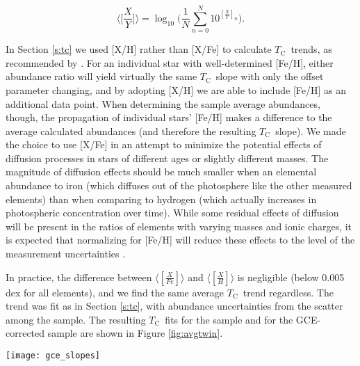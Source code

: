 \documentclass[twocolumn, trackchanges]{aastex62}
\newcommand{\tc}{$T_\mathrm{C}$}
\begin{document}
\begin{equation}
 \Big \langle \Big[ \frac{X}{Y} \Big] \Big \rangle = \log_{10} \Big( \frac{1}{N} \sum_{n=0}^{N} 10^{[\frac{X}{Y}]_n} \Big) .
\end{equation}

In Section \ref{s:tc} we used [X/H] rather than [X/Fe] to calculate \tc\ trends, as recommended by \citet{adibekyan16}. For an individual star with well-determined [Fe/H], either abundance ratio will yield virtually the same \tc\ slope with only the offset parameter changing, and by adopting [X/H] we are able to include [Fe/H] as an additional data point. When determining the sample average abundances, though, the propagation of individual stars' [Fe/H] makes a difference to the average calculated abundances (and therefore the resulting \tc\ slope). We made the choice to use [X/Fe] in an attempt to minimize the potential effects of diffusion processes in stars of different ages or slightly different masses. The magnitude of diffusion effects should be much smaller when  an elemental abundance to iron (which diffuses out of the photosphere like the other measured elements) than when comparing to hydrogen (which actually increases in photospheric concentration over time). While some residual effects of diffusion will be present in the ratios of elements with varying masses and ionic charges, it is expected that normalizing for [Fe/H] will reduce these effects to the level of the measurement uncertainties \citep{dotter17}.

In practice, the difference between $\langle [ \frac{X}{Fe} ] \rangle$ and $\langle [ \frac{X}{H} ] \rangle$ is negligible (below 0.005 dex for all elements), and we find the same average \tc\ trend regardless. The trend was fit as in Section \ref{s:tc}, with abundance uncertainties from the scatter among the sample. The resulting \tc\ fits for the sample and for the GCE-corrected sample are shown in Figure \ref{fig:avgtwin}.

\begin{figure*}
\centering
\texttt{[image: gce\_slopes]}
\caption{}
\label{fig:gce_slopes}
\end{figure*}
\end{document}
